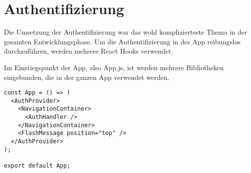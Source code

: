 \chapter{Authentifizierung}
Die Umsetzung der Authentifizierung war das wohl komplizierteste Thema in der gesamten
Entwicklungsphase. Um die Authentifizierung in der App reibungslos durchzuführen, werden mehrere
React Hooks verwendet.

Im Einstiegspunkt der App, also App.js, ist werden mehrere Bibliotheken eingebunden, die in der
ganzen App verwendet werden.

\begin{lstlisting}
const App = () => (
  <AuthProvider>
    <NavigationContainer>
      <AuthHandler />
    </NavigationContainer>
    <FlashMessage position="top" />
  </AuthProvider>
);

export default App;
\end{lstlisting}

\newpage


\newpage



